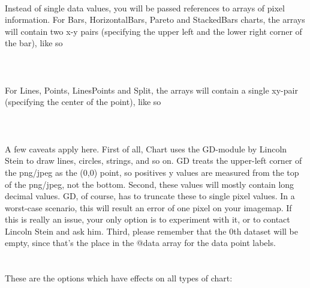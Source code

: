 \\
Instead of single data values, you will be passed references to arrays of pixel information. For Bars, HorizontalBars, Pareto and StackedBars charts, the arrays will contain two x-y pairs (specifying the upper left and the lower right corner of the bar), like so\\
\\
\\
\\ 
For Lines, Points, LinesPoints and Split, the arrays will contain a single xy-pair (specifying the center of the point), like so\\
\\
\\
\\
A few caveats apply here. First of all, Chart uses the GD-module by Lincoln Stein to draw lines, circles, strings, and so on. GD treats the upper-left corner of the png/jpeg as the (0,0) point, so positives y values are measured from the top of the png/jpeg, not the bottom. Second, these values will mostly contain long decimal values. GD, of course, has to truncate these to single pixel values. In a worst-case scenario, this will result an error of one pixel on your imagemap. If this is really an issue, your only option is to experiment with it, or to contact Lincoln Stein and ask him. Third, please remember that the 0th dataset will be empty, since that's the place in the @data array for the data point labels.\\
\\
\\   
\label{options} These are the options which have effects on all types of chart:
